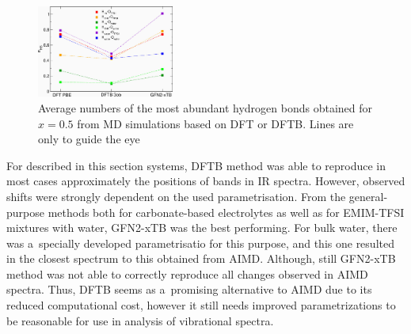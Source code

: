 \begin{figure}[ht]
    \centering
    \includegraphics[width=0.4\textwidth]{img/5-alternatives-to-aimd/2-il-h2o/hb-averages.png}
    \caption{Average numbers of the most abundant hydrogen bonds obtained for $x = 0.5$ from MD simulations based on DFT or DFTB. Lines are only to guide the eye}
    \label{fig:dftb-il-h2o-hb-averages}
\end{figure}

For described in this section systems, DFTB method was able to reproduce in most cases approximately the positions of bands in IR spectra. However, observed shifts were strongly dependent on the used parametrisation. From the general-purpose methods both for carbonate-based electrolytes as well as for EMIM-TFSI mixtures with water, GFN2-xTB was the best performing. For bulk water, there was a~specially developed parametrisatio for this purpose, and this one resulted in the closest spectrum to this obtained from AIMD. Although, still GFN2-xTB method was not able to correctly reproduce all changes observed in AIMD spectra. Thus, DFTB seems as a~promising alternative to AIMD due to its reduced computational cost, however it still needs improved parametrizations to be reasonable for use in analysis of vibrational spectra.

\cleardoublepage